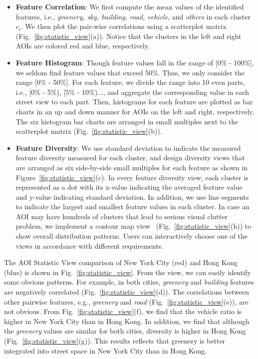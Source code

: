 \vspace*{-2mm}
\begin{itemize}

\item
\textbf{Feature Correlation}:
We first compute the mean values of the identified features, i.e., \textit{greenery, sky, building, road, vehicle}, and \textit{others} in each cluster $c_i$.
We then plot the pair-wise correlations using a scatterplot matrix (Fig.~\ref{fig:statistic_view}(a)).
Notice that the clusters in the left and right AOIs are colored red and blue, respectively.

\vspace*{-1mm}
\item
\textbf{Feature Histogram}:
Though feature values fall in the range of [0\% - 100\%], we seldom find feature values that exceed 50\%.
Thus, we only consider the range [0\% - 50\%].
For each feature, we divide the range into 10 even parts, i.e., [0\% - 5\%), [5\% - 10\%)..., and aggregate the corresponding value in each street view to each part.
Then, histograms for each feature are plotted as bar charts in an up and down manner for AOIs on the left and right, respectively.
The six histogram bar charts are arranged in small multiples next to the scatterplot matrix (Fig.~\ref{fig:statistic_view}(b)).

\vspace*{-1mm}
\item
\textbf{Feature Diversity}:
We use standard deviation to indicate the measured feature diversity measured for each cluster, and design diversity views that are arranged as six side-by-side small multiples for each feature as shown in Figure~\ref{fig:statistic_view}(c).
In every feature diversity view, each cluster is represented as a dot with its x-value indicating the averaged feature value and y-value indicating standard deviation.
In addition, we use line segments to indicate the largest and smallest feature values in each cluster. 
In case an AOI may have hundreds of clusters that lead to serious visual clutter problem, we implement a contour map view~\cite{chen_2014_visual} (Fig.~\ref{fig:statistic_view}(h)) to show overall distribution patterns. 
Users can interactively choose one of the views in accordance with different requirements.

\end{itemize}

The AOI Statistic View comparison of New York City (red) and Hong Kong (blue) is shown in Fig.~\ref{fig:statistic_view}.
From the view, we can easily identify some obvious patterns.
For example, in both cities, \textit{greenery} and \textit{building} features are negatively correlated (Fig.~\ref{fig:statistic_view}(d)).
The correlations between other pairwise features, e.g., \textit{greenery} and \textit{road} (Fig.~\ref{fig:statistic_view}(e)), are not obvious.
From Fig.~\ref{fig:statistic_view}(f), we find that the vehicle ratio is higher in New York City than in Hong Kong.
In addition, we find that although the \textit{greenery} values are similar for both cities, diversity is higher in Hong Kong (Fig.~\ref{fig:statistic_view}(g)).
This results reflects that greenery is better integrated into street space in New York City than in Hong Kong.

